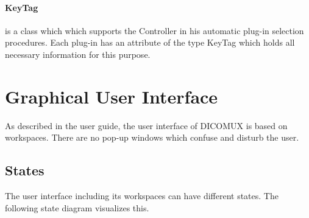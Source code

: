 \paragraph{KeyTag} is a class which which supports the Controller in his automatic plug-in selection procedures. Each plug-in has an attribute of the type KeyTag which holds all necessary information for this purpose.

\section{Graphical User Interface}
As described in the user guide, the user interface of DICOMUX is based on workspaces. There are no pop-up windows which confuse and disturb the user.

\subsection{States}
The user interface including its workspaces can have different states. The following state diagram visualizes this.

		\begin{minipage}{\textwidth} 
		\centering
		\label{fig:bild}
		\end{minipage}

%
%